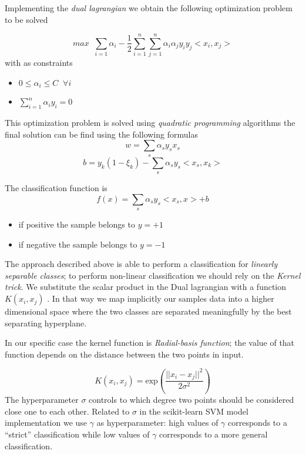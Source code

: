 \documentclass[a4paper,twocolumn]{article}
\begin{document}
Implementing the \emph{dual lagrangian} we obtain the following optimization problem to be solved

\begin{equation}
max \;\; \sum_{i=1}\alpha_{i} - \frac{1}{2} \sum_{i=1}^{n} \sum_{j=1}^{n} \alpha_{i}\alpha_{j} y_{i}y_{j} <x_{i}, x_{j}>
\end{equation}
with as constraints
\begin{itemize}
\item \(0 \leq \alpha_{i} \leq C \;\; \forall i\)
\item \(\sum^{n}_{i=1} \alpha_{i}y_{i}=0\)
\end{itemize}

This optimization problem is solved using \emph{quadratic programming} algorithms the
final solution can be find using the following formulas
\begin{equation}w= \sum_{s}\alpha_{s}y_{s}x_{s} \end{equation}
\begin{equation}b= y_{k}(1- \xi_{k}) - \sum_{s}\alpha_{s}y_{s}<x_{s}, x_{k}> \end{equation}


The classification function is
\begin{equation}f(x) = \sum_{s} \alpha_{s}y_{s}<x_{s}, x> + b\end{equation}
\begin{itemize}
\item if positive the sample belongs to \(y=+1\)
\item if negative the sample belongs to \(y=-1\)
\end{itemize}


The approach described above is able to perform a classification for \emph{linearly
separable classes}; to perform non-linear classification we should rely on the
\emph{Kernel trick}. We substitute the scalar product in the Dual lagrangian
with a function \(K(x_{i}, x_{j})\) . In that way we map implicitly our
samples data into a higher dimensional space where the two classes are
separated meaningfully by the best separating hyperplane.

In our specific case the kernel function is \emph{Radial-basis function}; the value of that function
depends on the distance between the two points in input.

\begin{equation}
K(x_{i}, x_{j}) = \text{exp}(\frac{||x_{i} - x_{j}||^{2}}{2 \sigma^{2}})
\end{equation}
The hyperparameter \(\sigma\) controls to which degree two points should be
considered close one to each other. Related to \(\sigma\) in the scikit-learn SVM
model implementation we use \(\gamma\) as hyperparameter: high values of \(\gamma\)
corresponds to a ``strict'' classification while low values of \(\gamma\)
corresponds to a more general classification.
\end{document}

